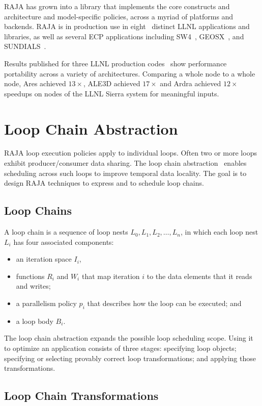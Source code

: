 RAJA has grown into a library that implements the core constructs and
architecture and model-specific policies, across a myriad of platforms and
backends. RAJA is in production use in eight~\cite{raja-ecp-report} distinct
LLNL applications and libraries, as well as several ECP applications including
SW4~\cite{sw4}, GEOSX~\cite{geosx}, and SUNDIALS~\cite{sundials}.

Results published for three LLNL production codes~\cite{raja-p3hpc} show
performance portability across a variety of architectures.  Comparing a whole
node to a whole node, Ares achieved $13\times$, ALE3D achieved $17\times$ and
Ardra achieved $12\times$ speedups on nodes of the LLNL Sierra system for
meaningful inputs.


\section{Loop Chain Abstraction}\label{sec:loopchain}
RAJA loop execution policies apply to individual loops.
Often two or more loops exhibit producer/consumer data sharing.
The loop chain abstraction~\cite{krieger2013loop} enables scheduling
across such loops to improve temporal data locality. 
The goal is to design RAJA techniques to express and to schedule loop chains.

\subsection{Loop Chains}

A loop chain is a sequence of loop nests $L_{0},L_{1},L_{2},\dots,L_{n}$,
in which each loop nest $L_{i}$ has four associated components:
\begin{itemize}
\item an iteration space $I_{i}$,
\item functions $R_{i}$ and $W_{i}$ that map iteration $i$ to the data 
      elements that it reads and writes;
\item a parallelism policy $p_{i}$ that describes how the loop can be executed; and
\item a loop body $B_{i}$.
\end{itemize} 

The loop chain abstraction expands the possible loop scheduling scope.
Using it to optimize an application consists of three stages:
specifying loop objects; specifying or selecting provably correct loop
transformations; and applying those transformations.

\subsection{Loop Chain Transformations}

